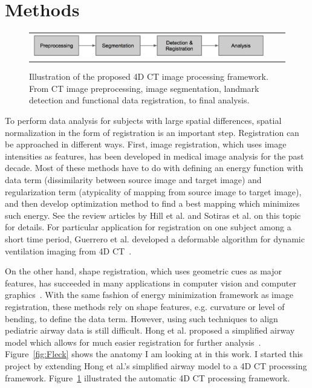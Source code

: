 \section{Methods}
\label{sec:methods}
\begin{figure}[tb]
  \begin{center}
    \begin{tabular}{ccc}
    \includegraphics[width=\figfullwidth] {fig/framework.png}
    \end{tabular}
    \caption{ \label{fig:framework} Illustration of the proposed 4D CT image processing framework. From CT image preprocessing, image segmentation, landmark detection and functional data registration, to final analysis.
    }
  \end{center}
\end{figure}

To perform data analysis for subjects with large spatial differences, spatial normalization in the form of registration is an important step.
Registration can be approached in different ways.
First, image registration, which uses image intensities as features, has been developed in medical image analysis for the past decade.
Most of these methods have to do with defining an energy function with data term (dissimilarity between source image and target image) and regularization term (atypicality of mapping from source image to target image),
and then develop optimization method to find a best mapping which minimizes such energy.
See the review articles by Hill et al. and Sotiras et al. on this topic~\cite{hill2001medical,otiras2013deformable} for details.
For particular application for registration on one subject among a short time period, Guerrero et al. developed a deformable algorithm for dynamic ventilation imaging from 4D CT~\cite{guerrero2006dynamic}.

On the other hand, shape registration, which uses geometric cues as major features, has succeeded in many applications in computer vision and computer graphics~\cite{belongie2002shape,li2012temporally}.
With the same fashion of energy minimization framework as image registration, these methods rely on shape features, e.g. curvature or level of bending, to define the data term.
However, using such techniques to align pediatric airway data is still difficult.
Hong et al. proposed a simplified airway model which allows for much easier registration for further analysis~\cite{hong2014statistical}.
Figure~\ref{fig:Fleck} shows the anatomy I am looking at in this work.
I started this project by extending Hong et al.'s simplified airway model to a 4D CT processing framework.
Figure~\ref{fig:framework} illustrated the automatic 4D CT processing framework.


